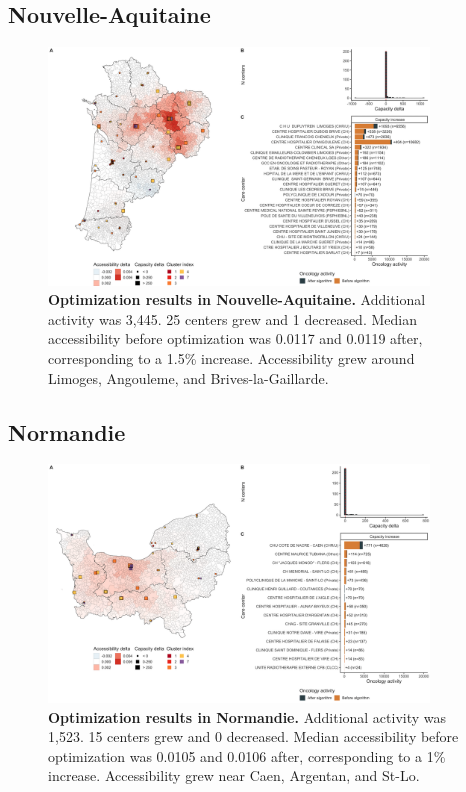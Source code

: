 \subsection*{Nouvelle-Aquitaine}

\begin{figure}[H]
    \includegraphics[width=0.9\textwidth]{images/camion/optim_region/optim_Nouvelle-Aquitaine.png}
    \centering
    \caption{
        \textbf{Optimization results in Nouvelle-Aquitaine.} Additional activity was 3,445. 25 centers grew and 1 decreased. Median accessibility before optimization was 0.0117 and 0.0119 after, corresponding to a 1.5\% increase. Accessibility grew around Limoges, Angouleme, and Brives-la-Gaillarde.
    }
\end{figure}

\subsection*{Normandie}

\begin{figure}[H]
    \includegraphics[width=0.9\textwidth]{images/camion/optim_region/optim_Normandie.png}
    \centering
    \caption{
        \textbf{Optimization results in Normandie.} Additional activity was 1,523. 15 centers grew and 0 decreased. Median accessibility before optimization was 0.0105 and 0.0106 after, corresponding to a 1\% increase. Accessibility grew near Caen, Argentan, and St-Lo.
    }
\end{figure}

